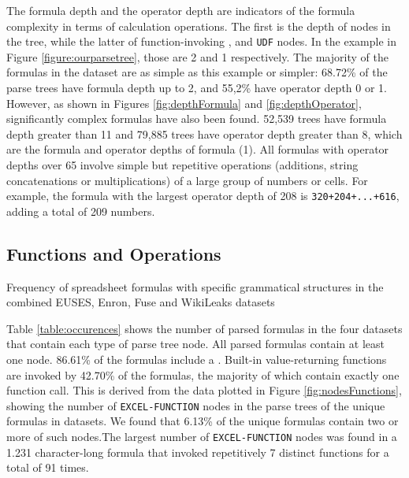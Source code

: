 \documentclass[times]{smrauth}
\begin{document}
The formula depth and the operator depth are indicators of the formula complexity in terms of calculation operations. The first is the depth of  nodes in the tree, while the latter of function-invoking  ,  and \texttt{UDF} nodes. In the example in Figure \ref{figure:ourparsetree}, those are 2 and 1 respectively. The majority of the formulas in the dataset are as simple as this example or simpler: 68.72\% of the parse trees have formula depth up to 2, and 55,2\% have operator depth 0 or 1. However, as shown in Figures \ref{fig:depthFormula} and \ref{fig:depthOperator}, significantly complex formulas have also been found. 52,539 trees have formula depth greater than 11 and 79,885 trees have operator depth greater than 8, which are the formula and operator depths of formula (1). All formulas with operator depths over 65 involve simple but repetitive operations (additions, string concatenations or multiplications) of a large group of numbers or cells. For example, the formula with the largest operator depth of 208 is \texttt{320+204+...+616}, adding a total of 209 numbers.
 
 \noindent
 	
\subsection{Functions and Operations}
\begin{table}
	\vspace{2mm}
	\caption{Frequency of spreadsheet formulas with specific grammatical structures in the combined EUSES, Enron, Fuse and WikiLeaks datasets}
	\label{table:occurences}
	\centering
	
\end{table}

Table \ref{table:occurences} shows the number of parsed formulas in the four datasets that contain each type of parse tree node. All parsed formulas contain at least one  node. 86.61\% of the formulas include a . Built-in value-returning functions are invoked by 42.70\% of the formulas, the majority of which contain exactly one function call. This is derived from the data plotted in Figure \ref{fig:nodesFunctions}, showing the number of \texttt{EXCEL-FUNCTION} nodes in the parse trees of the unique formulas in datasets. We found that 6.13\% of the unique formulas contain two or more of such nodes.The largest number of \texttt{EXCEL-FUNCTION} nodes was found in a 1.231 character-long formula that invoked repetitively 7 distinct functions for a total of 91 times.
\end{document}
